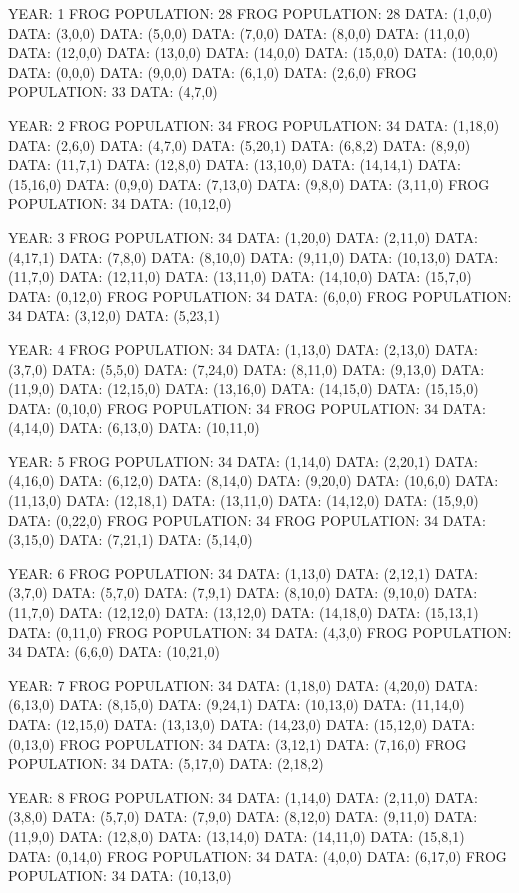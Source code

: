 \documentclass[12pt,a4paper]{article}
\begin{document}
{\footnotesize
YEAR: 1
FROG POPULATION: 28
FROG POPULATION: 28
DATA: (1,0,0)
DATA: (3,0,0)
DATA: (5,0,0)
DATA: (7,0,0)
DATA: (8,0,0)
DATA: (11,0,0)
DATA: (12,0,0)
DATA: (13,0,0)
DATA: (14,0,0)
DATA: (15,0,0)
DATA: (10,0,0)
DATA: (0,0,0)
DATA: (9,0,0)
DATA: (6,1,0)
DATA: (2,6,0)
FROG POPULATION: 33
DATA: (4,7,0)

YEAR: 2
FROG POPULATION: 34
FROG POPULATION: 34
DATA: (1,18,0)
DATA: (2,6,0)
DATA: (4,7,0)
DATA: (5,20,1)
DATA: (6,8,2)
DATA: (8,9,0)
DATA: (11,7,1)
DATA: (12,8,0)
DATA: (13,10,0)
DATA: (14,14,1)
DATA: (15,16,0)
DATA: (0,9,0)
DATA: (7,13,0)
DATA: (9,8,0)
DATA: (3,11,0)
FROG POPULATION: 34
DATA: (10,12,0)

YEAR: 3
FROG POPULATION: 34
DATA: (1,20,0)
DATA: (2,11,0)
DATA: (4,17,1)
DATA: (7,8,0)
DATA: (8,10,0)
DATA: (9,11,0)
DATA: (10,13,0)
DATA: (11,7,0)
DATA: (12,11,0)
DATA: (13,11,0)
DATA: (14,10,0)
DATA: (15,7,0)
DATA: (0,12,0)
FROG POPULATION: 34
DATA: (6,0,0)
FROG POPULATION: 34
DATA: (3,12,0)
DATA: (5,23,1)

YEAR: 4
FROG POPULATION: 34
DATA: (1,13,0)
DATA: (2,13,0)
DATA: (3,7,0)
DATA: (5,5,0)
DATA: (7,24,0)
DATA: (8,11,0)
DATA: (9,13,0)
DATA: (11,9,0)
DATA: (12,15,0)
DATA: (13,16,0)
DATA: (14,15,0)
DATA: (15,15,0)
DATA: (0,10,0)
FROG POPULATION: 34
FROG POPULATION: 34
DATA: (4,14,0)
DATA: (6,13,0)
DATA: (10,11,0)

YEAR: 5
FROG POPULATION: 34
DATA: (1,14,0)
DATA: (2,20,1)
DATA: (4,16,0)
DATA: (6,12,0)
DATA: (8,14,0)
DATA: (9,20,0)
DATA: (10,6,0)
DATA: (11,13,0)
DATA: (12,18,1)
DATA: (13,11,0)
DATA: (14,12,0)
DATA: (15,9,0)
DATA: (0,22,0)
FROG POPULATION: 34
FROG POPULATION: 34
DATA: (3,15,0)
DATA: (7,21,1)
DATA: (5,14,0)

YEAR: 6
FROG POPULATION: 34
DATA: (1,13,0)
DATA: (2,12,1)
DATA: (3,7,0)
DATA: (5,7,0)
DATA: (7,9,1)
DATA: (8,10,0)
DATA: (9,10,0)
DATA: (11,7,0)
DATA: (12,12,0)
DATA: (13,12,0)
DATA: (14,18,0)
DATA: (15,13,1)
DATA: (0,11,0)
FROG POPULATION: 34
DATA: (4,3,0)
FROG POPULATION: 34
DATA: (6,6,0)
DATA: (10,21,0)

YEAR: 7
FROG POPULATION: 34
DATA: (1,18,0)
DATA: (4,20,0)
DATA: (6,13,0)
DATA: (8,15,0)
DATA: (9,24,1)
DATA: (10,13,0)
DATA: (11,14,0)
DATA: (12,15,0)
DATA: (13,13,0)
DATA: (14,23,0)
DATA: (15,12,0)
DATA: (0,13,0)
FROG POPULATION: 34
DATA: (3,12,1)
DATA: (7,16,0)
FROG POPULATION: 34
DATA: (5,17,0)
DATA: (2,18,2)

YEAR: 8
FROG POPULATION: 34
DATA: (1,14,0)
DATA: (2,11,0)
DATA: (3,8,0)
DATA: (5,7,0)
DATA: (7,9,0)
DATA: (8,12,0)
DATA: (9,11,0)
DATA: (11,9,0)
DATA: (12,8,0)
DATA: (13,14,0)
DATA: (14,11,0)
DATA: (15,8,1)
DATA: (0,14,0)
FROG POPULATION: 34
DATA: (4,0,0)
DATA: (6,17,0)
FROG POPULATION: 34
DATA: (10,13,0)

}
\end{document}

